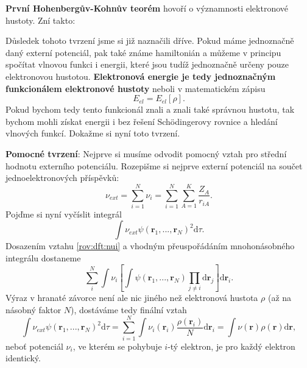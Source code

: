 \textbf{První Hohenbergův-Kohnův teorém} hovoří o významnosti elektronové hustoty. Zní takto:

\bigskip
\noindent {}

\bigskip
Důsledek tohoto tvrzení jsme si již naznačili dříve. Pokud máme jednoznačně daný externí potenciál, pak také známe hamiltonián a můžeme v principu spočítat vlnovou funkci i energii, které jsou tudíž jednoznačně určeny pouze elektronovou hustotou. \textbf{Elektronová energie je tedy jednoznačným funkcionálem elektronové hustoty} neboli v matematickém zápisu
\begin{equation}
E_{el}=E_{el}[\rho] .
\end{equation}
Pokud bychom tedy tento funkcionál znali a znali také správnou hustotu, tak bychom mohli získat energii i bez řešení Sch\"{o}dingerovy rovnice a hledání vlnových funkcí.
Dokažme si nyní toto tvrzení. 

\textbf{Pomocné tvrzení}: Nejprve si musíme odvodit pomocný vztah pro střední hodnotu externího potenciálu.
Rozepišme si nejprve externí potenciál na součet jednoelektronových příspěvků:
\begin{equation}
\nu_{ext}=\sum_{i=1}^N \nu_i = \sum_{i=1}^N \sum_{A=1}^K \frac{Z_A}{r_{iA}}.  
\label{rov:dft:nui}
\end{equation}
Pojďme si nyní vyčíslit integrál
\begin{equation}
\int \nu_{ext} \psi(\textbf{r}_1,...,\textbf{r}_N)^2\mathrm{d}\tau .
\end{equation}
Dosazením vztahu \eqref{rov:dft:nui} a vhodným přeuspořádáním mnohonásobného integrálu dostaneme
\begin{equation}
\sum_i^N \int \nu_i \left[\int \psi(\mathbf{r}_1,...,\mathbf{r}_N)\prod_{j\neq i}\mathrm{d}\textbf{r}_j\right] \mathrm{d}\textbf{r}_i .
\end{equation}
Výraz v hranaté závorce není ale nic jiného než elektronová hustota $\rho$ (až na násobný faktor $N$), dostáváme tedy finální vztah
\begin{equation}
\int \nu_{ext} \psi(\textbf{r}_1,...,\textbf{r}_N)^2\mathrm{d}\tau = \sum_{i=1}^N \int \nu_i(\textbf{r}_i)\frac{\rho(\textbf{r}_i)}{N}\mathrm{d}\mathbf{r}_i= \int \nu(\textbf{r})\rho(\textbf{r}) \mathrm{d}\mathbf{r} ,
\label{rov:dft:intnupsi}
\end{equation}
neboť potenciál $\nu_i$, ve kterém se pohybuje $i$-tý elektron, je pro každý elektron identický.

